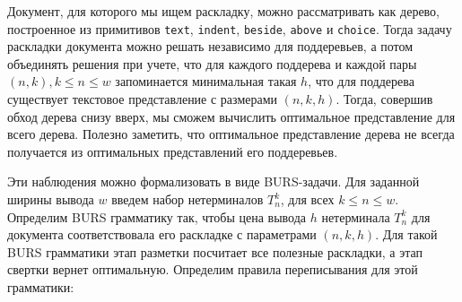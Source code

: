 Документ, для которого мы ищем раскладку, можно рассматривать как дерево, построенное из примитивов
\lstinline[language=Haskell]{text},
\lstinline[language=Haskell]{indent},
\lstinline[language=Haskell]{beside},
\lstinline[language=Haskell]{above} и \lstinline[language=Haskell]{choice}. Тогда задачу
раскладки документа можно решать независимо для поддеревьев, а потом объединять решения
при учете, что для каждого поддерева
и каждой пары $(n, k), k \le n \le w$ запоминается минимальная такая $h$, что для поддерева существует
текстовое представление с размерами $(n, k, h)$. Тогда, совершив обход дерева снизу вверх, мы сможем
вычислить оптимальное представление для всего дерева. Полезно заметить,
что оптимальное представление дерева не всегда получается из оптимальных представлений его
поддеревьев.

Эти наблюдения можно формализовать в виде BURS-задачи.
Для заданной ширины вывода $w$ введем набор нетерминалов
$T_n^k$, для всех $k \le n \le w$. Определим BURS грамматику так, чтобы цена вывода $h$ нетерминала
$T_n^k$ для документа соответствовала его раскладке с параметрами $(n, k, h)$.
Для такой BURS грамматики этап разметки посчитает все полезные раскладки, а этап свертки
вернет оптимальную. Определим правила переписывания для этой грамматики:
